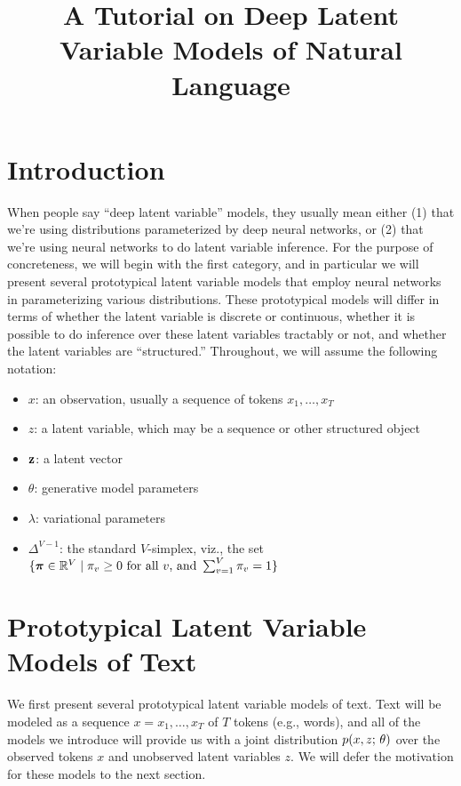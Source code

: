 \documentclass{article}
\begin{document}
\title{ \Large A Tutorial on Deep Latent Variable Models of Natural Language} 
\author{}
\date{}
\maketitle

\section{Introduction}
When people say ``deep latent variable'' models, they usually mean either (1) that we're using distributions parameterized by deep neural networks, or (2) that we're using neural networks to do latent variable inference. For the purpose of concreteness, we will begin with the first category, and in particular we will present several prototypical latent variable models that employ neural networks in parameterizing various distributions. These prototypical models will differ in terms of whether the latent variable is discrete or continuous, whether it is possible to do inference over these latent variables tractably or not, and whether the latent variables are ``structured.'' Throughout, we will assume the following notation:

\begin{itemize}
\item $x$: an observation, usually a sequence of tokens $x_1, \ldots, x_T$
\item $z$: a latent variable, which may be a sequence or other structured object
\item $\mathbf{z}$: a latent vector
\item  $\theta$:  generative model parameters
\item $\lambda$: variational parameters
\item $\Delta^{V-1}$: the standard $V$-simplex, viz., the set $\{\boldsymbol{\pi} \in \mathbb{R}^V \mid \pi_v \geq 0 \text{ for all $v$, and } \sum_{v=1}^V \pi_v = 1 \}$
\end{itemize}




\section{Prototypical Latent Variable Models of Text}
We first present several prototypical latent variable models of text. Text will be modeled as a sequence $x = x_1, \ldots, x_T$ of $T$ tokens (e.g., words), and all of the models we introduce will provide us with a joint distribution $p(x, z ; \, \theta)$ over the observed tokens $x$ and unobserved latent variables $z$. We will defer the motivation for these models to the next section.
\end{document}

